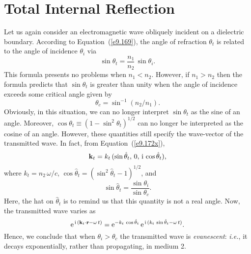 \section{Total Internal Reflection}
Let us again consider an electromagnetic wave obliquely incident on a dielectric boundary.  According to Equation~(\ref{e9.169}), the
angle of refraction $\theta_t$ is related to the angle of incidence $\theta_i$
via
\begin{equation}
\sin\theta_t = \frac{n_1}{n_2}\,\sin\theta_i.
\end{equation}
This formula presents no problems when $n_1< n_2$. However, if
$n_1> n_2$ then the formula predicts that $\sin\theta_t$ is greater than
unity when the angle of incidence exceeds some critical angle given by
\begin{equation}
\theta_c = \sin^{-1}(n_2/n_1).
\end{equation}
Obviously, in this situation, we can no longer interpret $\sin\theta_t$ as the sine of
an angle. Moreover, $\cos\theta_t \equiv (1-\sin^2\theta_t)^{1/2}$ can no longer be interpreted as the cosine of an angle. However, these quantities still specify the wave-vector of the
transmitted wave. In fact, from Equation~(\ref{e9.172x}), 
\begin{equation}
{\bf k}_t = k_t\,(\sin\hat{\theta}_t,\, 0,\, {\rm i}\,\cos\hat{\theta}_t),
\end{equation}
where $k_t=n_2\,\omega/c$, $\cos\hat{\theta}_t =(\sin^2\hat{\theta}_t-1)^{1/2}$, and
\begin{equation}
\sin\hat{\theta}_t = \frac{\sin\theta_i}{\sin\theta_c}.
\end{equation}
Here, the hat on $\hat{\theta}_t$ is to remind us that this  quantity is not a real angle.
Now, the transmitted wave varies as
\begin{equation}
{\rm e}^{\,{\rm i}\,({\bf k}_t\cdot{\bf r} - \omega\,t)} = {\rm e}^{-k_t\,\cos\hat{\theta}_t}\,{\rm e}^{\,{\rm i}\,(k_t\,\sin\hat{\theta}_t-\omega\,t)}.
\end{equation}
Hence, we conclude that when $\theta_i>\theta_c$ the transmitted wave
is {\em evanescent}: {\em i.e.}, it decays exponentially, rather than propagating, in medium 2.

